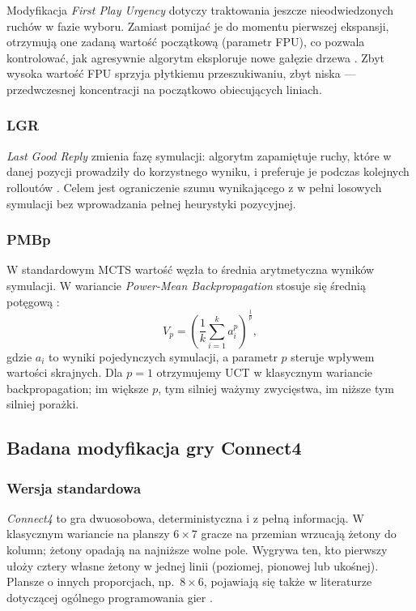 \documentclass[11pt, a4paper]{article}
\begin{document}
Modyfikacja \textit{First Play Urgency} dotyczy traktowania jeszcze nieodwiedzonych ruchów w fazie wyboru. Zamiast pomijać je do momentu pierwszej ekspansji, otrzymują one zadaną wartość początkową (parametr FPU), co pozwala kontrolować, jak agresywnie algorytm eksploruje nowe gałęzie drzewa \cite{cazenave2021batch}. Zbyt wysoka wartość FPU sprzyja płytkiemu przeszukiwaniu, zbyt niska --- przedwczesnej koncentracji na początkowo obiecujących liniach.

\subsubsection{LGR}

\textit{Last Good Reply} zmienia fazę symulacji: algorytm zapamiętuje ruchy, które w danej pozycji prowadziły do korzystnego wyniku, i preferuje je podczas kolejnych rolloutów \cite{drake2009lgr}. Celem jest ograniczenie szumu wynikającego z w pełni losowych symulacji bez wprowadzania pełnej heurystyki pozycyjnej.

\subsubsection{PMBp}

W standardowym MCTS wartość węzła to średnia arytmetyczna wyników symulacji. W wariancie \textit{Power-Mean Backpropagation} stosuje się średnią potęgową \cite{dam2020poweruct}:
\begin{equation*}
    V_p = \left(\frac{1}{k}\sum_{i=1}^k a_i^p\right)^{\frac{1}{p}},
\end{equation*}
gdzie $a_i$ to wyniki pojedynczych symulacji, a parametr $p$ steruje wpływem wartości skrajnych. Dla $p = 1$ otrzymujemy UCT w klasycznym wariancie backpropagation; im większe $p$, tym silniej ważymy zwycięstwa, im niższe tym silniej porażki.

\subsection{Badana modyfikacja gry Connect4}

\subsubsection{Wersja standardowa}

\textit{Connect4} to gra dwuosobowa, deterministyczna i z pełną informacją. W klasycznym wariancie na planszy $6 \times 7$ gracze na przemian wrzucają żetony do kolumn; żetony opadają na najniższe wolne pole. Wygrywa ten, kto pierwszy ułoży cztery własne żetony w jednej linii (poziomej, pionowej lub ukośnej). Plansze o innych proporcjach, np.\ $8 \times 6$, pojawiają się także w literaturze dotyczącej ogólnego programowania gier \cite{schiffel2010evaluation}.
\end{document}
